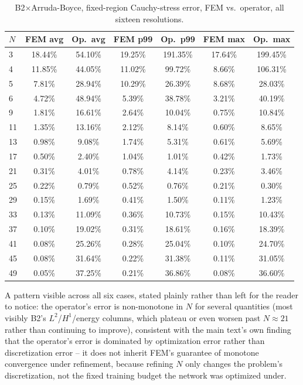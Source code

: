 \documentclass[final,5p,times]{elsarticle}
\begin{document}
\begin{table}[ht]
\centering
\caption{B2$\times$Arruda-Boyce, fixed-region Cauchy-stress error, FEM
  vs.\ operator, all sixteen resolutions.}
\label{tab:b1-b2ab-b}
\scriptsize
\begin{tabular}{lcccccc}
\toprule
$N$ & FEM avg & Op.\ avg & FEM p99 & Op.\ p99 & FEM max & Op.\ max \\
\midrule
3  & 18.44\% & 54.10\% & 19.25\% & 191.35\% & 17.64\% & 199.45\% \\
4  & 11.85\% & 44.05\% & 11.02\% & 99.72\%  & 8.66\%  & 106.31\% \\
5  & 7.81\%  & 28.94\% & 10.29\% & 26.39\%  & 8.68\%  & 28.03\%  \\
6  & 4.72\%  & 48.94\% & 5.39\%  & 38.78\%  & 3.21\%  & 40.19\%  \\
9  & 1.81\%  & 16.61\% & 2.64\%  & 10.04\%  & 0.75\%  & 10.84\%  \\
11 & 1.35\%  & 13.16\% & 2.12\%  & 8.14\%   & 0.60\%  & 8.65\%   \\
13 & 0.98\%  & 9.08\%  & 1.74\%  & 5.31\%   & 0.61\%  & 5.69\%   \\
17 & 0.50\%  & 2.40\%  & 1.04\%  & 1.01\%   & 0.42\%  & 1.73\%   \\
21 & 0.31\%  & 4.01\%  & 0.78\%  & 4.14\%   & 0.23\%  & 3.46\%   \\
25 & 0.22\%  & 0.79\%  & 0.52\%  & 0.76\%   & 0.21\%  & 0.30\%   \\
29 & 0.15\%  & 1.69\%  & 0.41\%  & 1.50\%   & 0.11\%  & 1.23\%   \\
33 & 0.13\%  & 11.09\% & 0.36\%  & 10.73\%  & 0.15\%  & 10.43\%  \\
37 & 0.10\%  & 19.02\% & 0.31\%  & 18.61\%  & 0.16\%  & 18.39\%  \\
41 & 0.08\%  & 25.26\% & 0.28\%  & 25.04\%  & 0.10\%  & 24.70\%  \\
45 & 0.08\%  & 31.64\% & 0.22\%  & 31.38\%  & 0.11\%  & 31.05\%  \\
49 & 0.05\%  & 37.25\% & 0.21\%  & 36.86\%  & 0.08\%  & 36.60\%  \\
\bottomrule
\end{tabular}
\end{table}

A pattern visible across all six cases, stated plainly rather than left
for the reader to notice: the operator's error is non-monotone in $N$
for several quantities (most visibly B2's $L^2$/$H^1$/energy columns,
which plateau or even worsen past $N{\approx}21$ rather than continuing
to improve), consistent with the main text's own finding
that the operator's error is dominated by optimization error rather than
discretization error -- it does not inherit FEM's guarantee of monotone
convergence under refinement, because refining $N$ only changes the
problem's discretization, not the fixed training budget the network was
optimized under.
\end{document}
